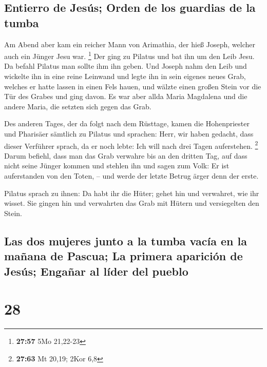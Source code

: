 \hypertarget{entierro-de-jesuxfas-orden-de-los-guardias-de-la-tumba}{%
\subsection{Entierro de Jesús; Orden de los guardias de la
tumba}\label{entierro-de-jesuxfas-orden-de-los-guardias-de-la-tumba}}

 Am Abend aber kam ein reicher Mann von Arimathia, der
hieß Joseph, welcher auch ein Jünger Jesu war. \footnote{\textbf{27:57}
  5Mo 21,22-23}  Der ging zu Pilatus und bat ihn um den
Leib Jesu. Da befahl Pilatus man sollte ihm ihn geben. 
Und Joseph nahm den Leib und wickelte ihn in eine reine Leinwand
 und legte ihn in sein eigenes neues Grab, welches er
hatte lassen in einen Fels hauen, und wälzte einen großen Stein vor die
Tür des Grabes und ging davon.  Es war aber allda Maria
Magdalena und die andere Maria, die setzten sich gegen das Grab.

 Des anderen Tages, der da folgt nach dem Rüsttage, kamen
die Hohenpriester und Pharisäer sämtlich zu Pilatus  und
sprachen: Herr, wir haben gedacht, dass dieser Verführer sprach, da er
noch lebte: Ich will nach drei Tagen auferstehen. \footnote{\textbf{27:63}
  Mt 20,19; 2Kor 6,8}  Darum befiehl, dass man das Grab
verwahre bis an den dritten Tag, auf dass nicht seine Jünger kommen und
stehlen ihn und sagen zum Volk: Er ist auferstanden von den Toten, --
und werde der letzte Betrug ärger denn der erste.

 Pilatus sprach zu ihnen: Da habt ihr die Hüter; gehet
hin und verwahret, wie ihr wisset.  Sie gingen hin und
verwahrten das Grab mit Hütern und versiegelten den Stein.

\hypertarget{las-dos-mujeres-junto-a-la-tumba-vacuxeda-en-la-mauxf1ana-de-pascua-la-primera-apariciuxf3n-de-jesuxfas-engauxf1ar-al-luxedder-del-pueblo}{%
\subsection{Las dos mujeres junto a la tumba vacía en la mañana de
Pascua; La primera aparición de Jesús; Engañar al líder del
pueblo}\label{las-dos-mujeres-junto-a-la-tumba-vacuxeda-en-la-mauxf1ana-de-pascua-la-primera-apariciuxf3n-de-jesuxfas-engauxf1ar-al-luxedder-del-pueblo}}

\hypertarget{section-27}{%
\section{28}\label{section-27}}

